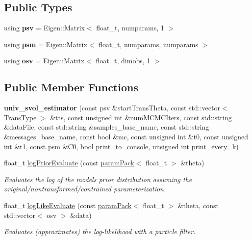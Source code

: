 \subsection*{Public Types}
\begin{DoxyCompactItemize}
\item 
\mbox{\label{classuniv__svol__estimator_a01b200275c33196fc939700e2ae2cae8}} 
using {\bfseries psv} = Eigen\+::\+Matrix$<$ float\+\_\+t, numparams, 1 $>$
\item 
\mbox{\label{classuniv__svol__estimator_a49cb877a0ab3ac89cd59659ff4100e4c}} 
using {\bfseries psm} = Eigen\+::\+Matrix$<$ float\+\_\+t, numparams, numparams $>$
\item 
\mbox{\label{classuniv__svol__estimator_ae88faafe9c8b75708d18260c0f4740a4}} 
using {\bfseries osv} = Eigen\+::\+Matrix$<$ float\+\_\+t, dimobs, 1 $>$
\end{DoxyCompactItemize}
\subsection*{Public Member Functions}
\begin{DoxyCompactItemize}
\item 
\mbox{\label{classuniv__svol__estimator_a16694966fefdaef94dcee68e961cf978}} 
{\bfseries univ\+\_\+svol\+\_\+estimator} (const psv \&start\+Trans\+Theta, const std\+::vector$<$ \hyperlink{param__transforms_8h_acee593b112f4fc85f850631b9c6aaae9}{Trans\+Type} $>$ \&tts, const unsigned int \&num\+M\+C\+M\+C\+Iters, const std\+::string \&data\+File, const std\+::string \&samples\+\_\+base\+\_\+name, const std\+::string \&messages\+\_\+base\+\_\+name, const bool \&mc, const unsigned int \&t0, const unsigned int \&t1, const psm \&C0, bool print\+\_\+to\+\_\+console, unsigned int print\+\_\+every\+\_\+k)
\item 
float\+\_\+t \hyperlink{classuniv__svol__estimator_a2e0e55bf061ca8f59fa5d42ae6495fdd}{log\+Prior\+Evaluate} (const \hyperlink{classparamPack}{param\+Pack}$<$ float\+\_\+t $>$ \&theta)
\begin{DoxyCompactList}\small\item\em Evaluates the log of the model\textquotesingle{}s prior distribution assuming the original/nontransformed/contrained parameterization. \end{DoxyCompactList}\item 
float\+\_\+t \hyperlink{classuniv__svol__estimator_a1223321e7875a4d40f9c4817753a2e01}{log\+Like\+Evaluate} (const \hyperlink{classparamPack}{param\+Pack}$<$ float\+\_\+t $>$ \&theta, const std\+::vector$<$ osv $>$ \&data)
\begin{DoxyCompactList}\small\item\em Evaluates (approximates) the log-\/likelihood with a particle filter. \end{DoxyCompactList}\end{DoxyCompactItemize}


